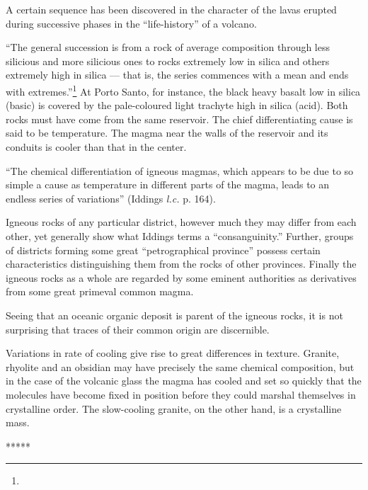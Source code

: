 \documentclass[a4paper, 12pt, oneside]{article}
\begin{document}
A certain sequence has been discovered in the character of the lavas erupted during successive phases in the ``life-history'' of a volcano.

``The general succession is from a rock of average composition through less silicious and more silicious ones to rocks extremely low in silica and others extremely high in silica --- that is, the series commences with a mean and ends with extremes.''\footnote{} At Porto Santo, for instance, the black heavy basalt low in silica (basic) is covered by the pale-coloured light trachyte high in silica (acid). Both rocks must have come from the same reservoir. The chief differentiating cause is said to be temperature. The magma near the walls of the reservoir and its conduits is cooler than that in the center.

``The chemical differentiation of igneous magmas, which appears to be due to so simple a cause as temperature in different parts of the magma, leads to an endless series of variations'' (Iddings \emph{l.c.} p. 164).

Igneous rocks of any particular district, however much they may differ from each other, yet generally show what Iddings terms a ``consanguinity.'' Further, groups of districts forming some great ``petrographical province'' possess certain characteristics distinguishing them from the rocks of other provinces. Finally the igneous rocks as a whole are regarded by some eminent authorities as derivatives from some great primeval common magma.

Seeing that an oceanic organic deposit is parent of the igneous rocks, it is not surprising that traces of their common origin are discernible.

Variations in rate of cooling give rise to great differences in texture. Granite, rhyolite and an obsidian may have precisely the same chemical composition, but in the case of the volcanic glass the magma has cooled and set so quickly that the molecules have become fixed in position before they could marshal themselves in crystalline order. The slow-cooling granite, on the other hand, is a crystalline mass.

\centerline{*\hspace{15mm}*\hspace{15mm}*\hspace{15mm}*\hspace{15mm}*}
\bigskip
\end{document}
